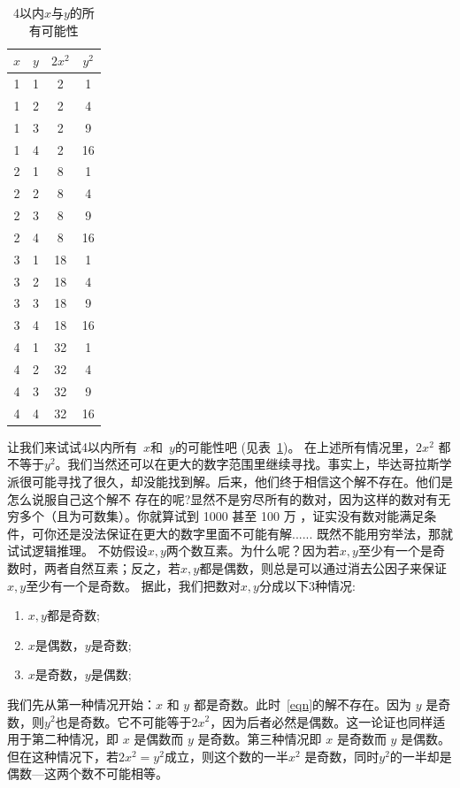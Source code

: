 \begin{table}[htbp]
\centering
\caption{4以内$x$与$y$的所有可能性}
\begin{tabular}{|c|c|c|c|}
\hline
$x$ & $y$ & $2x^2$ & $y^2$ \\
\hline
1 & 1 & 2 & 1 \\
\hline
1 & 2 & 2 & 4 \\
\hline
1 & 3 & 2 & 9 \\
\hline
1 & 4 & 2 & 16 \\
\hline
2 & 1 & 8 & 1 \\
\hline
2 & 2 & 8 & 4 \\
\hline
2 & 3 & 8 & 9 \\
\hline
2 & 4 & 8 & 16 \\
\hline
3 & 1 & 18 & 1 \\
\hline
3 & 2 & 18 & 4 \\
\hline
3 & 3 & 18 & 9 \\
\hline
3 & 4 & 18 & 16 \\
\hline
4 & 1 & 32 & 1 \\
\hline
4 & 2 & 32 & 4 \\
\hline
4 & 3 & 32 & 9 \\
\hline
4 & 4 & 32 & 16 \\
\hline
\end{tabular}
\label{tab:example}
\end{table}
让我们来试试4以内所有~$x$和~$y$的可能性吧 (见表~\ref{tab:example})。
在上述所有情况里，$2x^2$ 都不等于$y^2$。我们当然还可以在更大的数字范围里继续寻找。事实上，毕达哥拉斯学派很可能寻找了很久，却没能找到解。后来，他们终于相信这个解不存在。他们是怎么说服自己这个解不 存在的呢?显然不是穷尽所有的数对，因为这样的数对有{无穷多个（且为可数集）}。你就算试到 1000 甚至 100 万 ，证实没有数对能满足条件，可你还是没法保证在更大的数字里面不可能有解......
既然不能用穷举法，那就试试逻辑推理。
不妨假设$x,y$两个数互素。为什么呢？因为若$x,y$至少有一个是奇数时，两者自然互素；反之，若$x,y$都是偶数，则总是可以通过消去公因子来保证$x,y$至少有一个是奇数。
据此，我们把数对$x,y$分成以下3种情况:
\begin{enumerate}
\item $x,y$都是奇数;
\item $x$是偶数，$y$是奇数;
\item $x$是奇数，$y$是偶数;
\end{enumerate}
我们先从第一种情况开始：$x$ 和 $y$ 都是奇数。此时~\eqref{eqn}的解不存在。因为 $y$ 是奇数，则$y^2$也是奇数。它不可能等于$2x^2$，因为后者必然是偶数。这一论证也同样适用于第二种情况，即 $x$ 是偶数而 $y$ 是奇数。第三种情况即 $x$ 是奇数而 $y$ 是偶数。但在这种情况下，若$2x^2=y^2$成立，则这个数的一半$x^2$ 是奇数，同时$y^2$的一半却是偶数---这两个数不可能相等。

